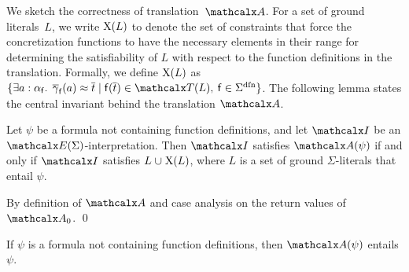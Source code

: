\begin{rep}
We sketch the correctness of translation~$\conv$.
For a set of ground literals~$L$, 
we write $\mathrm{X}( L )$ to denote the set of constraints that
force the concretization functions to have the necessary elements in their
range for determining the satisfiability of $L$ with respect to the function
definitions in the translation.
Formally, we define
$\mathrm{X}( L )$
as
$\{ \exists a : {\fargtype{\con{f}}}.\;\, \vecfarg{\con{f}}( a ) \teq \vec t
\mid \con{f}( \vec t ) \in \terms( L ),\: \con{f} \in \sfundefs{\Sigma}
\}$.
The following lemma states the central invariant behind the translation $\conv$.

\begin{lemma}\label{lem:conv}
Let $\psi$ be a formula not containing function definitions,
and let $\I$ be an $\extendsig{\Sigma}$-interpretation.
Then $\I$ satisfies $\conv( \psi )$ if and only if
$\I$ satisfies $L \cup \absconstraints( L )$, where $L$ is a set of ground $\Sigma$-literals that entail $\psi$.
\end{lemma}
\begin{proofsketch}
By definition of $\conv$ and case analysis on the return values of $\conv_0$.
\qed
\end{proofsketch}

\begin{corollary}\label{cor:conv}
If $\psi$ is a formula not containing function definitions, then $\conv( \psi )$ entails $\psi$.
\end{corollary}
\end{rep}

